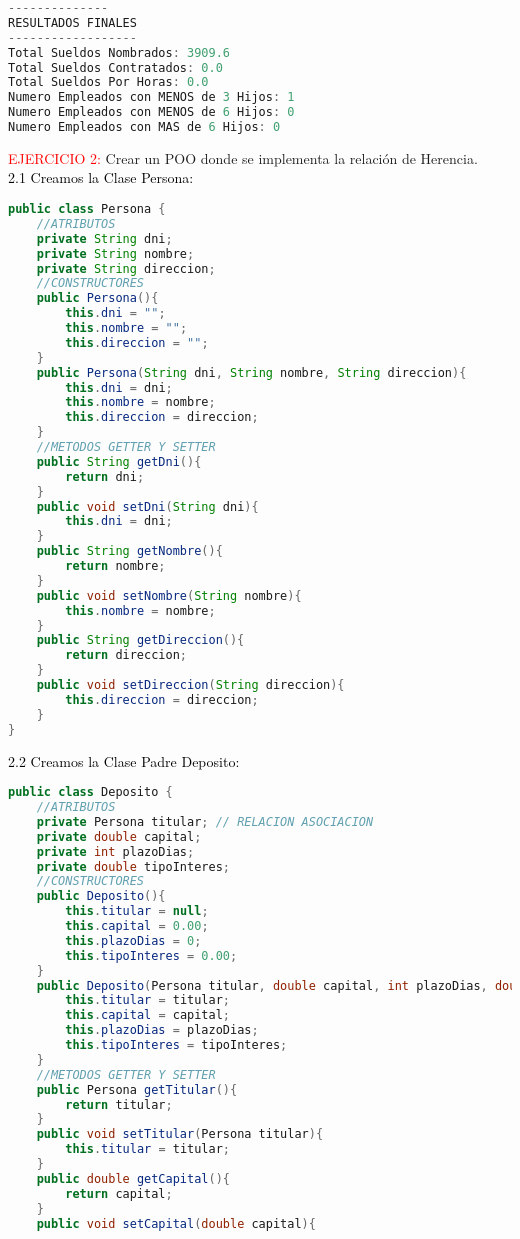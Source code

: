 \documentclass{article}
\begin{document}
\begin{itemize}
\begin{itemize}
\begin{lstlisting}[language=java]
--------------
RESULTADOS FINALES
------------------
Total Sueldos Nombrados: 3909.6
Total Sueldos Contratados: 0.0
Total Sueldos Por Horas: 0.0
Numero Empleados con MENOS de 3 Hijos: 1
Numero Empleados con MENOS de 6 Hijos: 0
Numero Empleados con MAS de 6 Hijos: 0
        \end{lstlisting}
        \textcolor{red}{EJERCICIO 2:} Crear un POO donde se implementa la relación de Herencia.
        \newline
        \\
        \textcolor{black}{2.1 Creamos la Clase Persona: }
        \begin{lstlisting}[language=java]
public class Persona {
    //ATRIBUTOS
    private String dni;
    private String nombre;
    private String direccion;
    //CONSTRUCTORES
    public Persona(){
        this.dni = "";
        this.nombre = "";
        this.direccion = "";
    }
    public Persona(String dni, String nombre, String direccion){
        this.dni = dni;
        this.nombre = nombre;
        this.direccion = direccion;
    }
    //METODOS GETTER Y SETTER
    public String getDni(){
        return dni;
    }
    public void setDni(String dni){
        this.dni = dni;
    }
    public String getNombre(){
        return nombre;
    }
    public void setNombre(String nombre){
        this.nombre = nombre;
    }
    public String getDireccion(){
        return direccion;
    }
    public void setDireccion(String direccion){
        this.direccion = direccion;
    }
}
        \end{lstlisting}
        \textcolor{black}{2.2 Creamos la Clase Padre Deposito: }
        \begin{lstlisting}[language=java]
public class Deposito {
    //ATRIBUTOS
    private Persona titular; // RELACION ASOCIACION
    private double capital;
    private int plazoDias;
    private double tipoInteres;
    //CONSTRUCTORES
    public Deposito(){
        this.titular = null;
        this.capital = 0.00;
        this.plazoDias = 0;
        this.tipoInteres = 0.00;
    }
    public Deposito(Persona titular, double capital, int plazoDias, double tipoInteres){
        this.titular = titular;
        this.capital = capital;
        this.plazoDias = plazoDias;
        this.tipoInteres = tipoInteres;
    }
    //METODOS GETTER Y SETTER
    public Persona getTitular(){
        return titular;
    }
    public void setTitular(Persona titular){
        this.titular = titular;
    }
    public double getCapital(){
        return capital;
    }
    public void setCapital(double capital){

\end{lstlisting}
\end{itemize}
\end{itemize}
\end{document}
